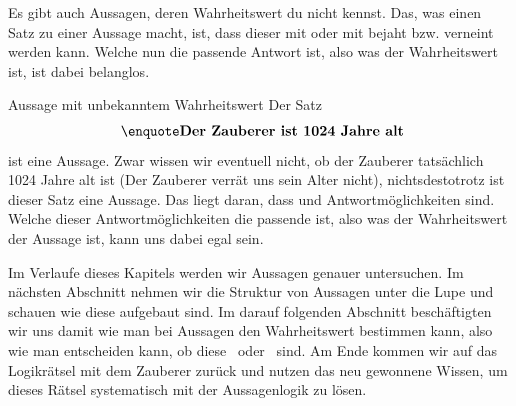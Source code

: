 \documentclass[../../main.tex]{subfiles}
\begin{document}
    Es gibt auch Aussagen, deren Wahrheitswert du nicht kennst. 
    Das, was einen Satz zu einer Aussage macht, 
    ist, dass dieser mit   oder 
    mit   bejaht bzw. verneint werden kann. 
    Welche nun die passende Antwort ist, also was der Wahrheitswert ist, ist dabei belanglos.
   
   \begin{example}{Aussage mit unbekanntem Wahrheitswert}
        Der Satz 
        \[\textrm{ \statement{Der Zauberer ist 1024 Jahre alt}}\]
        ist eine Aussage. Zwar wissen wir eventuell nicht, ob der Zauberer tatsächlich 1024 
        Jahre alt ist (Der Zauberer verrät uns sein Alter nicht), nichtsdestotrotz ist 
        dieser Satz eine Aussage. Das liegt daran, dass 
          und    
        Antwortmöglichkeiten sind. Welche dieser Antwortmöglichkeiten die passende ist, also 
        was der Wahrheitswert der Aussage ist, kann uns dabei egal sein.
   \end{example}

    Im Verlaufe dieses Kapitels werden wir Aussagen genauer untersuchen. Im nächsten 
    Abschnitt nehmen wir die Struktur von Aussagen unter die Lupe und schauen wie 
    diese aufgebaut sind. Im darauf folgenden Abschnitt beschäftigten wir uns damit 
    wie man bei Aussagen den Wahrheitswert bestimmen kann, 
    also wie man entscheiden kann, ob diese \wahr\  oder \falsch\  sind. Am Ende 
    kommen wir auf das Logikrätsel mit dem Zauberer zurück und nutzen das neu 
    gewonnene Wissen, um dieses Rätsel systematisch mit der Aussagenlogik zu lösen.

    
        
\end{document}
